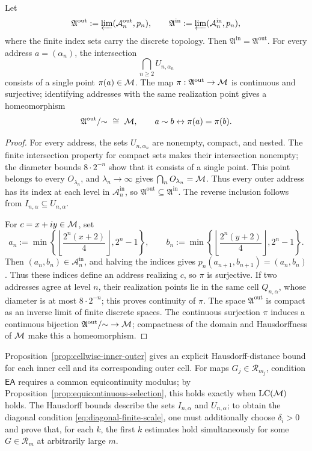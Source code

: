 \begin{theorem}
\label{thm:cell-category-limit}
Let
\[
 \mathfrak A^{\mathrm{out}}:=
 \varprojlim(\mathcal A_n^{\mathrm{out}},p_n),\qquad
 \mathfrak A^{\mathrm{in}}:=
 \varprojlim(\mathcal A_n^{\mathrm{in}},p_n),
\]
where the finite index sets carry the discrete topology. Then
\(\mathfrak A^{\mathrm{in}}=\mathfrak A^{\mathrm{out}}\). For every
address \(a=(\alpha_n)\), the intersection
\[
 \bigcap_{n\ge2}U_{n,\alpha_n}
\]
consists of a single point \(\pi(a)\in\mathcal M\). The map
\(\pi:\mathfrak A^{\mathrm{out}}\to\mathcal M\) is continuous and surjective;
identifying addresses with the same realization point gives a
homeomorphism
\[
 \mathfrak A^{\mathrm{out}}/{\sim}\ \cong\ \mathcal M,
 \qquad a\sim b\leftrightarrow\pi(a)=\pi(b).
\]
\end{theorem}
\begin{proof}
For every address, the sets \(U_{n,\alpha_n}\) are nonempty, compact,
and nested. The finite intersection property for compact sets makes
their intersection nonempty; the diameter bounds \(8\cdot2^{-n}\)
show that it consists of a single point. This point belongs to every
\(O_{\lambda_n}\), and \(\lambda_n\to\infty\) gives
\(\bigcap_nO_{\lambda_n}=\mathcal M\). Thus every outer address has its index
at each level in \(\mathcal A_n^{\mathrm{in}}\), so
\(\mathfrak A^{\mathrm{out}}\subseteq\mathfrak A^{\mathrm{in}}\).
The reverse inclusion follows from
\(I_{n,\alpha}\subseteq U_{n,\alpha}\).

For \(c=x+iy\in\mathcal M\), set
\[
 a_n:=\min\left\{\left\lfloor\frac{2^n(x+2)}4\right\rfloor,2^n-1\right\},
 \qquad
 b_n:=\min\left\{\left\lfloor\frac{2^n(y+2)}4\right\rfloor,2^n-1\right\}.
\]
Then \((a_n,b_n)\in\mathcal A_n^{\mathrm{in}}\), and halving the
indices gives \(p_n(a_{n+1},b_{n+1})=(a_n,b_n)\). Thus these indices
define an address realizing \(c\), so \(\pi\) is surjective. If two
addresses agree at level \(n\), their realization points lie in the
same cell \(Q_{n,\alpha}\), whose diameter is at most
\(8\cdot2^{-n}\); this proves continuity of \(\pi\). The space
\(\mathfrak A^{\mathrm{out}}\) is compact as an inverse limit of finite
discrete spaces. The continuous surjection \(\pi\) induces a continuous
bijection \(\mathfrak A^{\mathrm{out}}/{\sim}\to\mathcal M\); compactness of the
domain and Hausdorffness of \(\mathcal M\) make this a homeomorphism.
\end{proof}

Proposition~\ref{prop:cellwise-inner-outer} gives an explicit
Hausdorff-distance bound for each inner cell and its corresponding
outer cell. For maps \(G_j\in\mathcal R_{m_j}\), condition
\(\mathsf{EA}\) requires a common equicontinuity modulus; by
Proposition~\ref{prop:equicontinuous-selection}, this holds exactly
when \(\operatorname{LC}(\mathcal M)\) holds. The Hausdorff bounds describe the sets
\(I_{n,\alpha}\) and \(U_{n,\alpha}\); to obtain the diagonal condition
\eqref{eq:diagonal-finite-scale}, one must additionally choose
\(\delta_i>0\) and prove that, for each \(k\), the first \(k\) estimates
hold simultaneously for some \(G\in\mathcal R_m\) at arbitrarily
large \(m\).

